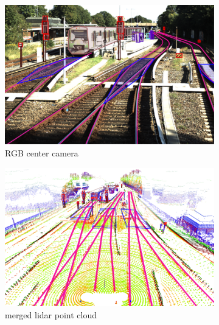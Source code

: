 \begin{figure}[H]
    \centering
    \begin{subfigure}{0.24\textwidth}
        \centering
        \includegraphics[width=\textwidth]{PICs/datasets/OSDaR23_dataset/labeled_image.png}
        \caption{\ac{RGB} center camera}
    \end{subfigure}%
    \hfill
    \begin{subfigure}{0.24\textwidth}
        \centering
        \includegraphics[width=\textwidth]{PICs/datasets/OSDaR23_dataset/labeled_3D.png}
        \caption{merged lidar point cloud}
    \end{subfigure}%
    \hfill
    \begin{subfigure}{0.24\textwidth}
        \centering

\end{subfigure}
\end{figure}
